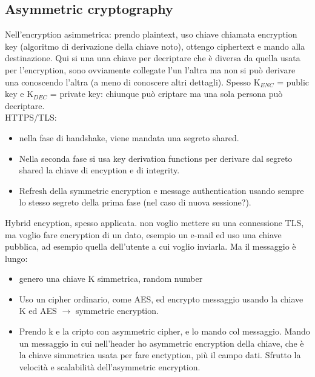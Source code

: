\documentclass[16px]{article}
\begin{document}
\subsection{Asymmetric cryptography}
Nell'encryption asimmetrica: prendo plaintext, uso chiave chiamata encryption key (algoritmo di derivazione della chiave noto), ottengo ciphertext e mando alla destinazione. Qui si una una chiave per decriptare che è diversa da quella usata per l'encryption, sono ovviamente collegate l'un l'altra ma non si può derivare una conoscendo l'altra (a meno di conoscere altri dettagli). Spesso K$_{ENC}$ = public key e K$_{DEC}$ = private key: chiunque può criptare ma una sola persona può decriptare.\\ HTTPS/TLS:
\begin{itemize}
\item nella fase di handshake, viene mandata una segreto shared. 
\item Nella seconda fase si usa key derivation functions per derivare dal segreto shared la chiave di encyption e di integrity.
\item Refresh della symmetric encryption e message authentication usando sempre lo stesso segreto della prima fase (nel caso di nuova sessione?).
\end{itemize}
Hybrid encyption, spesso applicata. non voglio mettere su una connessione TLS, ma voglio fare encryption di un dato, esempio un e-mail ed uso una chiave pubblica, ad esempio quella dell'utente a cui voglio inviarla. Ma il messaggio è lungo:
\begin{itemize}
\item genero una chiave K simmetrica, random number
\item Uso un cipher ordinario, come AES, ed encrypto messaggio usando la chiave K ed AES $\rightarrow$ symmetric encryption.
\item Prendo k e la cripto con asymmetric cipher, e lo mando col messaggio. Mando un messaggio in cui nell'header ho asymmetric encryption della chiave, che è la chiave simmetrica usata per fare enctyption, più il  campo dati. Sfrutto la velocità e scalabilità dell'asymmetric encryption.
\end{itemize}
\end{document}
